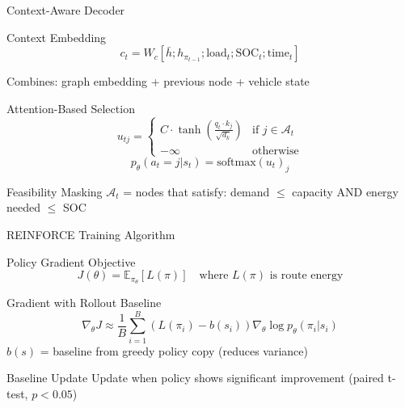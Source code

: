 \documentclass[aspectratio=169,11pt]{beamer}
\begin{document}
\begin{frame}{Context-Aware Decoder}
    \begin{block}{Context Embedding}
        \[
        c_t = W_c \left[\bar{h}; h_{\pi_{t-1}}; \text{load}_t; \text{SOC}_t; \text{time}_t\right]
        \]
        
        Combines: graph embedding + previous node + vehicle state
    \end{block}
    
    \begin{block}{Attention-Based Selection}
        \[
        u_{tj} = \begin{cases}
            C \cdot \tanh\left(\frac{q_t \cdot k_j}{\sqrt{d_k}}\right) & \text{if } j \in \mathcal{A}_t \\
            -\infty & \text{otherwise}
        \end{cases}
        \]
        \[
        p_\theta(a_t = j | s_t) = \text{softmax}(u_t)_j
        \]
    \end{block}
    
    \begin{exampleblock}{Feasibility Masking}
        $\mathcal{A}_t$ = nodes that satisfy: demand $\leq$ capacity AND energy needed $\leq$ SOC
    \end{exampleblock}
\end{frame}

\begin{frame}{REINFORCE Training Algorithm}
    \begin{block}{Policy Gradient Objective}
        \vspace{-0.2cm}
        \[
        J(\theta) = \mathbb{E}_{\pi_\theta}\left[L(\pi)\right] \quad \text{where } L(\pi) \text{ is route energy}
        \]
        \vspace{-0.3cm}
    \end{block}

    \begin{block}{Gradient with Rollout Baseline}
        \vspace{-0.2cm}
        \[
        \nabla_\theta J \approx \frac{1}{B}\sum_{i=1}^{B} \left(L(\pi_i) - b(s_i)\right) \nabla_\theta \log p_\theta(\pi_i | s_i)
        \]
        \vspace{-0.3cm}
        \small $b(s)$ = baseline from greedy policy copy (reduces variance)
    \end{block}

    \begin{exampleblock}{Baseline Update}
        Update when policy shows significant improvement (paired t-test, $p < 0.05$)
    \end{exampleblock}
\end{frame}
\end{document}
